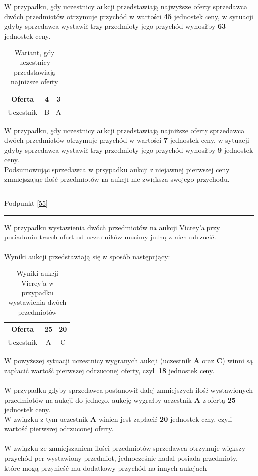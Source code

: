\documentclass[
    12pt, %
]{../fphw}
\begin{document}
W przypadku, gdy uczestnicy aukcji przedstawiają najwyższe oferty
sprzedawca dwóch przedmiotów otrzymuje przychód w wartości \textbf{45}
jednostek ceny, w sytuacji gdyby sprzedawca wystawił trzy przedmioty
jego przychód wynosiłby \textbf{63} jednostek ceny.

\begin{table}[H]
    \centering
    \begin{tabular}{ | c | c | c |}
        \hline
        Oferta    & 4 & 3 \\
        \hline
        Uczestnik & B & A \\
        \hline
    \end{tabular}
    \caption{Wariant, gdy uczestnicy przedstawiają najniższe oferty}
\end{table}

W przypadku, gdy uczestnicy aukcji przedstawiają najniższe oferty
sprzedawca dwóch przedmiotów otrzymuje przychód w wartości \textbf{7}
jednostek ceny, w sytuacji gdyby sprzedawca wystawił trzy przedmioty
jego przychód wynosiłby \textbf{9} jednostek ceny.
\\
Podsumowując sprzedawca w przypadku aukcji z niejawnej pierwszej ceny
zmniejszając ilość przedmiotów na aukcji nie zwiększa swojego przychodu.

\par\noindent\rule{\textwidth}{0.4pt}
Podpunkt \ref{55}
\par\noindent\rule{\textwidth}{0.4pt}
W przypadku wystawienia dwóch przedmiotów na aukcji Vicrey'a
przy posiadaniu trzech ofert od uczestników musimy jedną z nich odrzucić.
\\ \\
Wyniki aukcji przedstawiają się w sposób następujący: \\
\begin{table}[H]
    \centering
    \begin{tabular}{ | c | c | c |}
        \hline
        Oferta    & 25 & 20 \\
        \hline
        Uczestnik & A  & C  \\
        \hline
    \end{tabular}
    \caption{Wyniki aukcji Vicrey'a w przypadku wystawienia dwóch przedmiotów}
\end{table}

W powyższej sytuacji uczestnicy wygranych aukcji (uczestnik \textbf{A} oraz \textbf{C})
winni są zapłacić wartość pierwszej odrzuconej oferty, czyli \textbf{18}
jednostek ceny.
\\ \\
W przypadku gdyby sprzedawca postanowił dalej zmniejszych ilość wystawionych
przedmiotów na aukcji do jednego, aukcję wygrałby uczestnik \textbf{A}
z ofertą \textbf{25} jednostek ceny. \\
W związku z tym uczestnik \textbf{A} winien jest zapłacić \textbf{20}
jednostek ceny, czyli wartość pierwszej odrzuconej oferty.
\\ \\
W związku ze zmniejszaniem ilości przedmiotów sprzedawca otrzymuje
większy przychód per wystawiony przedmiot, jednocześnie nadal posiada
przedmioty, które mogą przynieść mu dodatkowy przychód na innych aukcjach.
\end{document}
